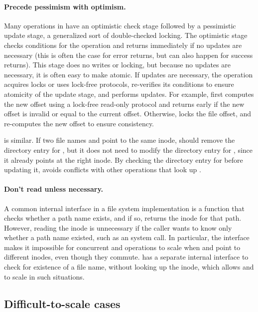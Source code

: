 \paragraph{Precede pessimism with optimism.} Many operations
in \fs have an optimistic check stage followed by a pessimistic update
stage, a generalized sort of double-checked locking.  The optimistic
stage checks conditions for the operation and returns immediately if
no updates are necessary (this is often the case for error returns,
but can also happen for success returns).  This stage does no writes
or locking, but because no updates are necessary, it is often easy to
make atomic.  If updates are necessary, the operation acquires
locks or uses lock-free protocols, re-verifies its conditions to
ensure atomicity of the update stage, and performs updates.  For
example,  first computes the new offset using a lock-free
read-only protocol and returns early if the new offset is invalid or
equal to the current offset.  Otherwise,  locks the file
offset, and re-computes the new offset to ensure consistency.

 is similar.  If two file names  and 
point to the
same inode,  should remove the directory entry for
, but it does not need to modify the directory entry for
, since
it already points at the right inode.  By checking the directory
entry for  before updating it,  avoids
conflicts with other operations that look up .


\paragraph{Don't read unless necessary.}  A common internal interface
in a file system implementation is a  function that
checks whether a path name exists, and if so, returns the inode for
that path.
%
However, reading the inode is unnecessary
if the caller wants to know only whether a path name existed, such as
an  system call.  In particular, the 
interface makes it impossible for concurrent 
and  operations to scale when  and 
point to different inodes, even though they commute.
\fs has a separate internal interface to check for existence of a
file name, without looking up the inode, which allows 
and  to scale in such situations.


\subsection{Difficult-to-scale cases}

